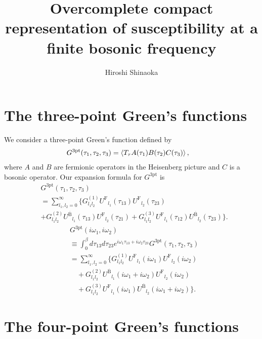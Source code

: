\documentclass[prb,twocolumn,superscriptaddress]{revtex4-1}
\newcommand{\Gthree}{\ensuremath{G^\mathrm{3pt}}}
\newcommand{\UF}{\ensuremath{U^\mathrm{F}}}
\newcommand{\enhUB}{\ensuremath{U^\mathrm{\overline{B}}}}
\begin{document}
\title{Overcomplete compact representation of susceptibility at a finite bosonic frequency}
\author{Hiroshi Shinaoka}


\begin{abstract}
\end{abstract}


\maketitle
\section{The three-point Green's functions}
We consider a three-point Green's function defined by
\begin{align}
  \Gthree(\tau_1, \tau_2, \tau_3) &= \braket{T_\mathrm{\tau} A(\tau_1) B(\tau_2) C(\tau_3)},\label{eq:3point}
\end{align}
where $A$ and $B$ are fermionic operators in the Heisenberg picture and $C$ is a bosonic operator.
Our expansion formula for $\Gthree$ is
\begin{align}
	& \Gthree(\tau_1, \tau_2, \tau_3) \nonumber\\
	& =  \sum_{l_1,l_2=0}^\infty \Big\{G^{(1)}_{l_1l_2}\UF_{l_1}(\tau_{13})\UF_{l_2}(\tau_{23}) \nonumber\\
	& +  G_{l_1 l_2}^{(2)} \enhUB_{l_1}(\tau_{13})\UF_{l_2}(\tau_{21}) +
	G_{l_1 l_2}^{(3)} \UF_{l_1}(\tau_{12})\enhUB_{l_2}(\tau_{23})
	\Big\}.
\end{align}
\begin{align}
	&\Gthree(i\omega_1, i\omega_2)\nonumber\\
	&\equiv \int_0^\beta d\tau_{13} d\tau_{23} e^{i\omega_1 \tau_{13} + i \omega_2 \tau_{23}} \Gthree(\tau_1, \tau_2, \tau_3)
	\nonumber\\
	& =  \sum_{l_1,l_2=0}^\infty \Big\{G^{(1)}_{l_1l_2}\UF_{l_1}(i\omega_1)\UF_{l_2}(i\omega_2) \nonumber\\
	& \quad+  G_{l_1 l_2}^{(2)} \enhUB_{l_1}(i\omega_1 + i \omega_2)\UF_{l_2}(i \omega_2)
	\nonumber\\
	& \quad+
	G_{l_1 l_2}^{(3)} \UF_{l_1}(i\omega_1)\enhUB_{l_2}(i\omega_1 + i \omega_2)
	\Big\}.\label{eq:three-point-exp2}
\end{align}

\section{The four-point Green's functions}
\end{document}
